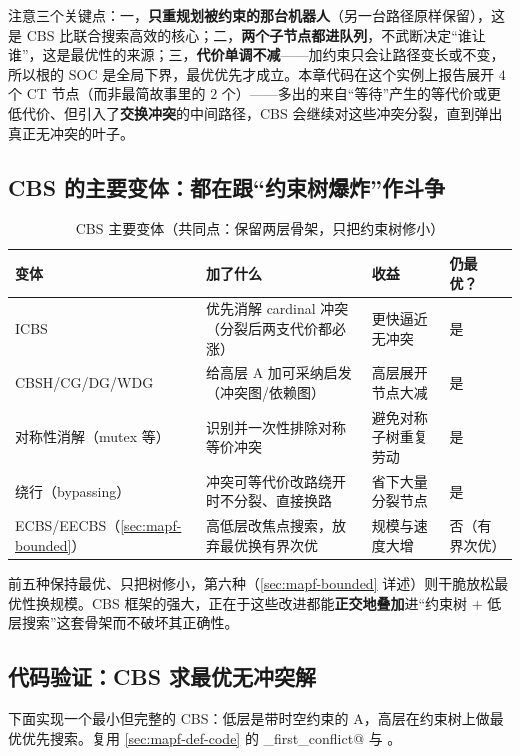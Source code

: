 注意三个关键点：一，\textbf{只重规划被约束的那台机器人}（另一台路径原样保留），这是 CBS 比联合搜索高效的核心；二，\textbf{两个子节点都进队列}，不武断决定“谁让谁”，这是最优性的来源；三，\textbf{代价单调不减}——加约束只会让路径变长或不变，所以根的 $\mathrm{SOC}$ 是全局下界，最优优先才成立。本章代码在这个实例上报告展开 $4$ 个 CT 节点（而非最简故事里的 $2$ 个）——多出的来自“等待”产生的等代价或更低代价、但引入了\textbf{交换冲突}的中间路径，CBS 会继续对这些冲突分裂，直到弹出真正无冲突的叶子。

\subsection{CBS 的主要变体：都在跟“约束树爆炸”作斗争}
\label{sec:mapf-cbs-variants}

\begin{table}[H]\centering\small
\caption{CBS 主要变体（共同点：保留两层骨架，只把约束树修小）}
\label{tab:mapf-cbs-variants}
\begin{tabular}{llll}
\toprule
变体 & 加了什么 & 收益 & 仍最优？ \\
\midrule
ICBS\cite{boyarski2015icbs} & 优先消解 cardinal 冲突（分裂后两支代价都必涨） & 更快逼近无冲突 & 是 \\
CBSH/CG/DG/WDG\cite{felner2018adding,li2019cbsh} & 给高层 A\* 加可采纳启发（冲突图/依赖图） & 高层展开节点大减 & 是 \\
对称性消解（mutex 等） & 识别并一次性排除对称等价冲突 & 避免对称子树重复劳动 & 是 \\
绕行（bypassing） & 冲突可等代价改路绕开时不分裂、直接换路 & 省下大量分裂节点 & 是 \\
ECBS/EECBS（\cref{sec:mapf-bounded}） & 高低层改焦点搜索，放弃最优换有界次优 & 规模与速度大增 & 否（有界次优） \\
\bottomrule
\end{tabular}
\end{table}

前五种保持最优、只把树修小，第六种（\cref{sec:mapf-bounded} 详述）则干脆放松最优性换规模。CBS 框架的强大，正在于这些改进都能\textbf{正交地叠加}进“约束树 $+$ 低层搜索”这套骨架而不破坏其正确性。

\subsection{代码验证：CBS 求最优无冲突解}
\label{sec:mapf-cbs-code}

下面实现一个最小但完整的 CBS：低层是带时空约束的 A\*，高层在约束树上做最优优先搜索。复用 \cref{sec:mapf-def-code} 的 \verb@find_first_conflict@ 与 \verb@neighbors@。

